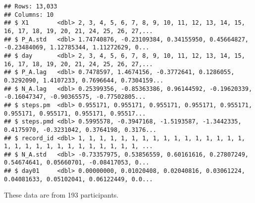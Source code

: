 \documentclass[]{article}
\newenvironment{Shaded}{\begin{snugshade}}{\end{snugshade}}
\newcommand{\DataTypeTok}[1]{\textcolor[rgb]{0.13,0.29,0.53}{#1}}
\newcommand{\DecValTok}[1]{\textcolor[rgb]{0.00,0.00,0.81}{#1}}
\newcommand{\KeywordTok}[1]{\textcolor[rgb]{0.13,0.29,0.53}{\textbf{#1}}}
\newcommand{\NormalTok}[1]{#1}
\newcommand{\OperatorTok}[1]{\textcolor[rgb]{0.81,0.36,0.00}{\textbf{#1}}}
\newcommand{\StringTok}[1]{\textcolor[rgb]{0.31,0.60,0.02}{#1}}
\begin{document}
\begin{Shaded}
\end{Shaded}

\begin{verbatim}
## Rows: 13,033
## Columns: 10
## $ X1        <dbl> 2, 3, 4, 5, 6, 7, 8, 9, 10, 11, 12, 13, 14, 15, 16, 17, 18, 19, 20, 21, 24, 25, 26, 27,...
## $ P_A.std   <dbl> 1.74740876, -0.23109384, 0.34155950, 0.45664827, -0.23484069, 1.12785344, 1.11272629, 0...
## $ day       <dbl> 2, 3, 4, 5, 6, 7, 8, 9, 10, 11, 12, 13, 14, 15, 16, 17, 18, 19, 20, 21, 24, 25, 26, 27,...
## $ P_A.lag   <dbl> 0.7478597, 1.4674156, -0.3772641, 0.1286055, 0.3292090, 1.4107233, 0.7696644, 0.7304159...
## $ N_A.lag   <dbl> 0.25399356, -0.85363386, 0.96144592, -0.19620339, -0.16047347, -0.90365575, -0.77502805...
## $ steps.pm  <dbl> 0.955171, 0.955171, 0.955171, 0.955171, 0.955171, 0.955171, 0.955171, 0.955171, 0.95517...
## $ steps.pmd <dbl> 0.5995578, -0.3947168, -1.5193587, -1.3442335, 0.4175970, -0.3231042, 0.3764198, 0.3176...
## $ record_id <dbl> 1, 1, 1, 1, 1, 1, 1, 1, 1, 1, 1, 1, 1, 1, 1, 1, 1, 1, 1, 1, 1, 1, 1, 1, 1, 1, 1, 1, 1, ...
## $ N_A.std   <dbl> -0.73357975, 0.53856559, 0.60161616, 0.27807249, 0.54674641, 0.05660701, -0.08417053, 0...
## $ day01     <dbl> 0.00000000, 0.01020408, 0.02040816, 0.03061224, 0.04081633, 0.05102041, 0.06122449, 0.0...
\end{verbatim}

These data are from 193 participants.

\begin{Shaded}
\end{Shaded}
\end{document}
